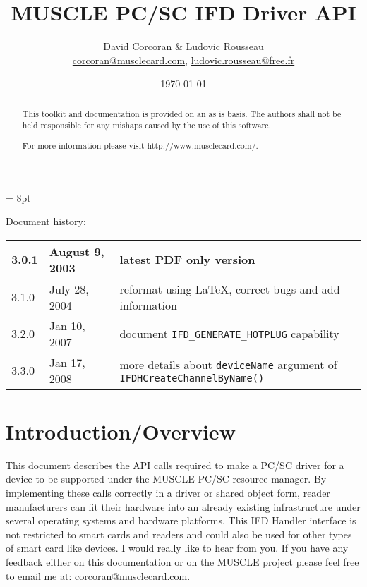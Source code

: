 \documentclass[a4paper,12pt]{article}
\title{MUSCLE PC/SC IFD Driver API}
\author{David Corcoran \& Ludovic Rousseau\\
\url{corcoran@musclecard.com}, \url{ludovic.rousseau@free.fr}}
\date{\today}
\begin{document}
\maketitle

\begin{abstract}
This toolkit and documentation is provided on an as is basis. The
authors shall not be held responsible for any mishaps caused by the use
of this software.

For more information please visit \url{http://www.musclecard.com/}.

\end{abstract}

\parskip = 8pt

\addtolength{\parindent}{-\parindent}

Document history: \\
\begin{tabular}{|l|l|l|}
\hline
3.0.1 & August 9, 2003 & latest PDF only version \\
\hline
3.1.0 & July 28, 2004 & reformat using \LaTeX{}, correct bugs and add
information \\
\hline
3.2.0 & Jan 10, 2007 & document \texttt{IFD\_GENERATE\_HOTPLUG} capability \\
\hline
3.3.0 & Jan 17, 2008 & more details about \texttt{deviceName} argument
of \texttt{IFDHCreateChannelByName()} \\
\hline
\end{tabular}

\newpage
\tableofcontents
\newpage

\section{Introduction/Overview}

This document describes the API calls required to make a PC/SC driver
for a device to be supported under the MUSCLE PC/SC resource manager. By
implementing these calls correctly in a driver or shared object form,
reader manufacturers can fit their hardware into an already existing
infrastructure under several operating systems and hardware platforms.
This IFD Handler interface is not restricted to smart cards and readers
and could also be used for other types of smart card like devices. I
would really like to hear from you. If you have any feedback either on
this documentation or on the MUSCLE project please feel free to email me
at: \url{corcoran@musclecard.com}.
\end{document}
